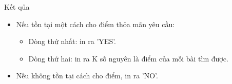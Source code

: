 Kết qủa
\begin{itemize}
	\item Nếu tồn tại một cách cho điểm thỏa mãn yêu cầu:
\begin{itemize}
	\item Dòng thứ nhất: in ra 'YES'.
	\item Dòng thứ hai: in ra K số nguyên là điểm của mỗi bài tìm được.
\end{itemize}
	\item Nếu không tồn tại cách cho điểm, in ra 'NO'.
\end{itemize}
